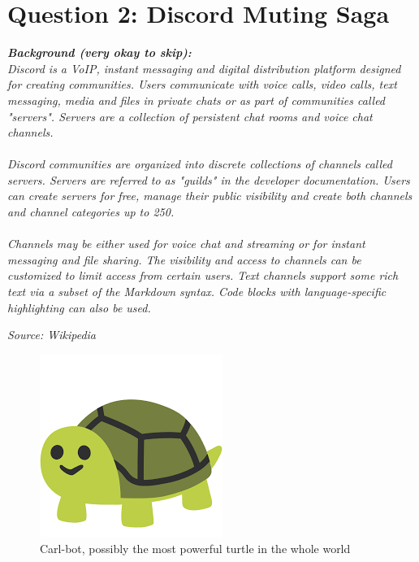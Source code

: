 \section{Question 2: Discord Muting Saga}
\textbf{\textit{Background (very okay to skip):}} \\
\textit{
Discord is a VoIP, instant messaging and digital distribution platform designed for creating communities. 
Users communicate with voice calls, video calls, text messaging, media and files in private chats or as part 
of communities called "servers". Servers are a collection of persistent chat rooms and voice chat channels. \\ \\
Discord communities are organized into discrete collections of channels called servers. Servers are referred to as 
"guilds" in the developer documentation. Users can create servers for free, manage their public visibility and 
create both channels and channel categories up to 250. \\ \\
Channels may be either used for voice chat and streaming or for instant messaging and file sharing. The visibility 
and access to channels can be customized to limit access from certain users. Text channels support some rich text via 
a subset of the Markdown syntax. Code blocks with language-specific highlighting can also be used.
}
\begin{flushright}
    \textit{Source: Wikipedia}
\end{flushright}

\begin{figure}
    \begin{center}
        \includegraphics[scale=0.4]{carlbot.png}
    \end{center}
    \captionsetup{labelformat=empty}
    \caption{Carl-bot, possibly the most powerful turtle in the whole world}
\end{figure}

